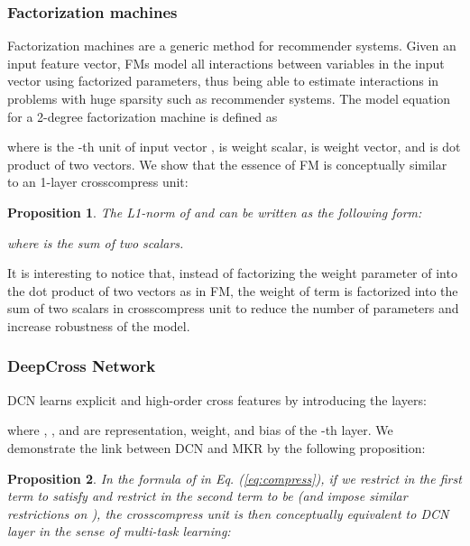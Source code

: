 \documentclass[sigconf]{acmart}
\newtheorem{proposition}{Proposition}
\begin{document}
		\subsubsection{Factorization machines}
		Factorization machines \cite{rendle2010factorization, rendle2012factorization} are a generic method for recommender systems.
		Given an input feature vector, FMs model all interactions between variables in the input vector using factorized parameters, thus being able to estimate interactions in problems with huge sparsity such as recommender systems.
		The model equation for a 2-degree factorization machine is defined as
		
		where  is the -th unit of input vector ,  is weight scalar,  is weight vector, and  is dot product of two vectors.
		We show that the essence of FM is conceptually similar to an 1-layer crosscompress unit:
		
		\begin{proposition}
		\label{prop:1}
			The L1-norm of  and  can be written as the following form:
			
			where  is the sum of two scalars.
		\end{proposition}
		
		It is interesting to notice that, instead of factorizing the weight parameter of  into the dot product of two vectors as in FM, the weight of term  is factorized into the sum of two scalars in crosscompress unit to reduce the number of parameters and increase robustness of the model.
		
		
		\subsubsection{DeepCross Network}
		DCN \cite{wang2017deep} learns explicit and high-order cross features by introducing the layers:
					
		where , , and  are representation, weight, and bias of the -th layer.
		We demonstrate the link between DCN and MKR by the following proposition:
		
		\begin{proposition}
		\label{prop:2}
			In the formula of  in Eq. (\ref{eq:compress}), if we restrict  in the first term to satisfy  and restrict  in the second term to be  (and impose similar restrictions on ), the crosscompress unit is then conceptually equivalent to DCN layer in the sense of multi-task learning:
			
		\end{proposition}
		
\end{document}
